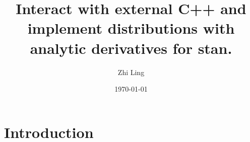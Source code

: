\documentclass[11pt]{article}
\title{Interact with external C++ and implement distributions with analytic derivatives for stan.}
\author{Zhi Ling}
\date{\today}
\begin{document}
\maketitle


\section{Introduction}
\begin{comment}
stan 的反向自动微分完全消除了导数的实现负担，但同时也成为了stan程序典型的性能瓶颈。为了直观地感受这种差异，以下是一个可运行的例子。

For example, one may typically have the code for negative binomial distribution

\begin{lstlisting}[language=Stan, style=lgeneral]
target += neg_binomial_2_lpmf(y | alpha, beta);
\end{lstlisting}

However, when the negative binomial distribution needs to be truncated, we may have
\begin{lstlisting}[language=Stan, style=lgeneral]
target += neg_binomial_2_lpmf(y | alpha, beta) T[0,k];
// or
target += neg_binomial_2_lpmf(y | alpha, beta) - neg_binomial_2_lcdf(k | alpha, beta);
// or in anywhere of the model you linked target and neg_binomial_2_lcdf/lccdf.
\end{lstlisting}

Therefore, it would be beneficial to promote statisticians and developers to work together to improve the Stan math library. The following facts were pointed out by \href{https://github.com/stan-dev/stan/wiki/Contributing-to-Stan-Without-C-Plus-Plus--Experience}{Stan's developer wiki}: the development of the Stan language is hindered not only by technical challenges but also by mathematical complexities, especially when adding new probability density functions. Ideally, each density function in Stan should have analytical specifications of its density, gradient, cumulative distribution function, and random number generation. This necessitates extensive research before coding. 


This has many benefits: 
\begin{enumerate}
	\item Significantly reduces reverse automatic differentiation (AD) overhead. Since Stan spends most of its time calculating the gradient of the log probability function\footnote{\href{https://mc-stan.org/docs/stan-users-guide/vectorization.html}{Stan user's guide}}, this therefore greatly reduces the runtime and memory overhead of Stan programs.
	\item C++ template metaprogramming feature avoids manually and repeatedly writing function overloads, achieving automatic input adaptation and vectorization.
	\item One can submit the newly written distribution to \href{https://mc-stan.org/users/interfaces/math}{Stan Math Library}, contributing to the open source community. So that everyone can benefit from it.
\end{enumerate}



\end{comment}
\end{document}
